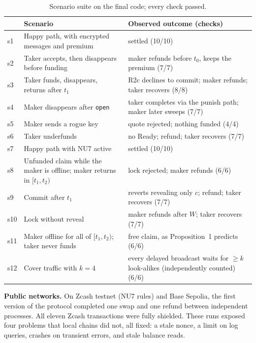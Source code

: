 \documentclass[10pt,letterpaper]{article}
\makeatletter
\renewcommand\section{\@startsection{section}{1}{\z@}{-1.3em}{0.45em}{\normalfont\large\bfseries}}
\theoremstyle{plain}
\theoremstyle{definition}
\newcommand{\fn}[1]{\texttt{#1}}
\makeatother
\begin{document}
\begin{table}[H]
\centering\small
\begin{tabularx}{\linewidth}{@{}lXl@{}}
\toprule
& \textbf{Scenario} & \textbf{Observed outcome (checks)}\\
\midrule
s1 & Happy path, with encrypted messages and premium & settled (10/10)\\
s2 & Taker accepts, then disappears before funding & maker refunds before $t_0$, keeps the premium (7/7)\\
s3 & Taker funds, disappears, returns after $t_1$ & R2c declines to commit; maker refunds; taker recovers (8/8)\\
s4 & Maker disappears after \fn{open} & taker completes via the punish path; maker later sweeps (7/7)\\
s5 & Maker sends a rogue key & quote rejected; nothing funded (4/4)\\
s6 & Taker underfunds & no Ready; refund; taker recovers (7/7)\\
s7 & Happy path with NU7 active & settled (10/10)\\
s8 & Unfunded claim while the maker is offline; maker returns in $[t_1,t_2)$ & lock rejected; maker refunds (6/6)\\
s9 & Commit after $t_1$ & reverts revealing only $c$; refund; taker recovers (7/7)\\
s10 & Lock without reveal & maker refunds after $W$; taker recovers (7/7)\\
s11 & Maker offline for all of $[t_1,t_2)$; taker never funds & free claim, as Proposition~1 predicts (6/6)\\
s12 & Cover traffic with $k=4$ & every delayed broadcast waits for $\ge k$ look-alikes (independently counted) (6/6)\\
\bottomrule
\end{tabularx}
\caption{Scenario suite on the final code; every check passed.}
\end{table}

\textbf{Public networks.} On Zcash testnet (NU7 rules) and Base Sepolia, the first version of the
protocol completed one swap and one refund between independent processes. All eleven Zcash
transactions were fully shielded. These runs exposed four problems that local chains did not, all
fixed: a stale nonce, a limit on log queries, crashes on transient errors, and stale balance reads.

\section{Related Work}
\end{document}
